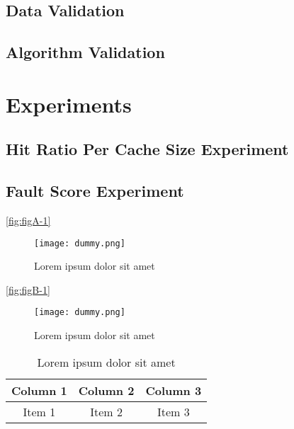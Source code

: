 \subsection{Data Validation}

\subsection{Algorithm Validation}

\section{Experiments}

\subsection{Hit Ratio Per Cache Size Experiment}

\subsection{Fault Score Experiment}

\lipsum[1-3]

\lipsum[1-1] \ref{fig:figA-1}

\begin{figure}[H]
    \centering
    \texttt{[image: dummy.png]}
    \caption{Lorem ipsum dolor sit amet}
    \label{fig:figA-3}
\end{figure}

\lipsum[1-1] \ref{fig:figB-1}

\begin{figure}[H]
    \centering
    \texttt{[image: dummy.png]}
    \caption{Lorem ipsum dolor sit amet}
    \label{fig:figB-3}
\end{figure}


\lipsum[1-1] \cite{reference-1}


\lipsum[1-1] \cite{reference-2}


\lipsum[1-1] \cite{reference-3}


\begin{table}[ht!]
    \centering
    \begin{tabular}{c c c}
        \hline
        Column 1 & Column 2 & Column 3 \\
        \hline
        Item 1   & Item 2   & Item 3   \\
    \end{tabular}
    \caption{Lorem ipsum dolor sit amet}
    \label{tab:tabA-3}
\end{table}

